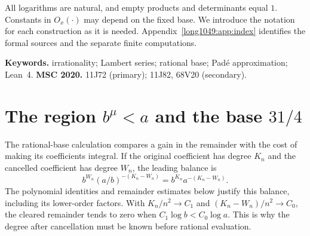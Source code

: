 \documentclass[11pt]{article}
\begin{document}
All logarithms are natural, and empty products and determinants
equal $1$. Constants in $O_x(\cdot)$ may depend on the fixed base.
We introduce the notation for each construction as it is needed.
Appendix~\ref{long1049:app:index} identifies the formal sources and
the separate finite computations.

\medskip
\noindent\textbf{Keywords.} irrationality; Lambert series; rational base;
Pad\'e approximation; Lean~4.
\qquad
\textbf{MSC 2020.} 11J72 (primary); 11J82, 68V20 (secondary).

\section{The region \texorpdfstring{$b^{\mu}<a$}{b\textasciicircum mu < a} and the base \texorpdfstring{$31/4$}{31/4}}\label{long1049:sec:region}

The rational-base calculation compares a gain in the remainder
with the cost of making its coefficients integral. If the original
coefficient has degree $K_n$ and the cancelled coefficient has
degree $W_n$, the leading balance is
\begin{equation}\label{long1049:eq:degree-balance}
 b^{W_n}(a/b)^{-(K_n-W_n)}
 =b^{K_n}a^{-(K_n-W_n)}.
\end{equation}
The polynomial identities and remainder estimates below justify
this balance, including its lower-order factors. With
$K_n/n^2\to C_1$ and $(K_n-W_n)/n^2\to C_0$, the cleared
remainder tends to zero when $C_1\log b<C_0\log a$.
This is why the degree after cancellation must be known before
rational evaluation.
\end{document}
